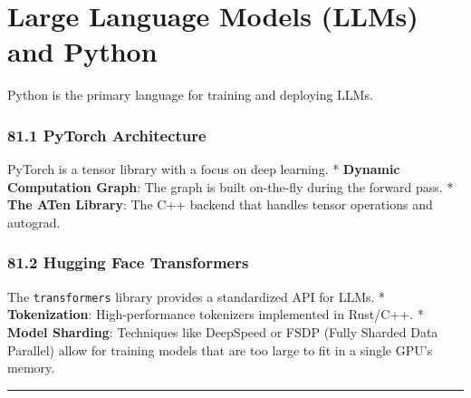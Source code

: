 \hypertarget{large-language-models-llms-and-python}{%
\chapter{Large Language Models (LLMs) and
Python}\label{large-language-models-llms-and-python}}

Python is the primary language for training and deploying LLMs.

\hypertarget{pytorch-architecture}{%
\subsection{81.1 PyTorch Architecture}\label{pytorch-architecture}}

PyTorch is a tensor library with a focus on deep learning. *
\textbf{Dynamic Computation Graph}: The graph is built on-the-fly during
the forward pass. * \textbf{The ATen Library}: The C++ backend that
handles tensor operations and autograd.

\hypertarget{hugging-face-transformers}{%
\subsection{81.2 Hugging Face
Transformers}\label{hugging-face-transformers}}

The \passthrough{\lstinline!transformers!} library provides a
standardized API for LLMs. * \textbf{Tokenization}: High-performance
tokenizers implemented in Rust/C++. * \textbf{Model Sharding}:
Techniques like DeepSpeed or FSDP (Fully Sharded Data Parallel) allow
for training models that are too large to fit in a single GPU's memory.

\begin{center}\rule{0.5\linewidth}{0.5pt}\end{center}
